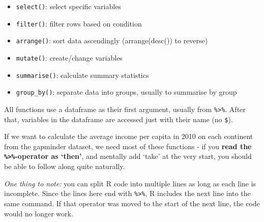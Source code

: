 \documentclass[
]{book}
\providecommand{\tightlist}{%
  \setlength{\itemsep}{0pt}\setlength{\parskip}{0pt}}
\begin{document}
\begin{itemize}
\tightlist
\item
  \texttt{select()}: select specific variables
\item
  \texttt{filter()}: filter rows based on condition
\item
  \texttt{arrange()}: sort data ascendingly (arrange(desc()) to reverse)
\item
  \texttt{mutate()}: create/change variables
\item
  \texttt{summarise()}: calculate summary statistics
\item
  \texttt{group\_by()}: separate data into groups, usually to summarise by group
\end{itemize}

All functions use a dataframe as their first argument, usually from \texttt{\%\textgreater{}\%}. After that, variables in the dataframe are accessed just with their name (no \texttt{\$}).

If we want to calculate the average income per capita in 2010 on each continent from the gapminder dataset, we need most of these functions - if you \textbf{read the \texttt{\%\textgreater{}\%}-operator as `then'}, and mentally add `take' at the very start, you should be able to follow along quite naturally.

\emph{One thing to note:} you can split R code into multiple lines as long as each line is incomplete. Since the lines here end with \texttt{\%\textgreater{}\%}, R includes the next line into the same command. If that operator was moved to the start of the next line, the code would no longer work.
\end{document}
